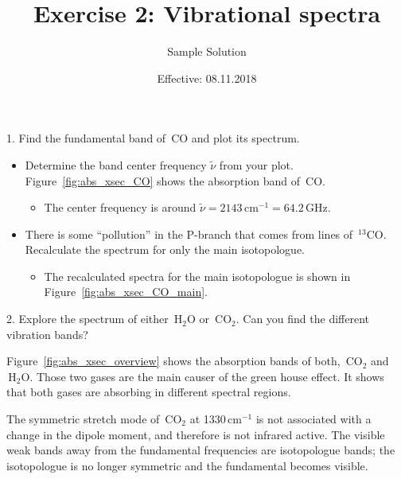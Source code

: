 \documentclass[paper=a4, fontsize=11pt]{scrartcl} %
\title{Exercise 2: Vibrational spectra}
\author{Sample Solution}
\date{Effective: 08.11.2018}
\newcommand{\symb}[1]{$\,\mathrm{#1}$}
\begin{document}
\maketitle

1. Find the fundamental band of \symb{CO} and plot its spectrum.
\begin{itemize}
  \item Determine the band center frequency $\tilde{\nu}$ from your plot.
    Figure~\ref{fig:abs_xsec_CO} shows the absorption band of \symb{CO}.
    \begin{itemize}
      \item The center frequency is around
        $\tilde{\nu} = 2143\,\mathrm{cm}^{-1} = 64.2\,\mathrm{GHz}$.
    \end{itemize}

  \item There is some “pollution” in the P-branch that comes from lines
    of \symb{^{13}CO}. Recalculate the spectrum for only the main isotopologue.
    \begin{itemize}
      \item The recalculated spectra for the main isotopologue is shown in
        Figure~\ref{fig:abs_xsec_CO_main}.
    \end{itemize}
\end{itemize}

2. Explore the spectrum of either \symb{H_2O} or \symb{CO_2}. Can you find the
different vibration bands?

Figure~\ref{fig:abs_xsec_overview} shows the absorption bands of both,
\symb{CO_2} and \symb{H_2O}. Those two gases are the main causer of the green
house effect. It shows that both gases are absorbing in different spectral
regions.

The symmetric stretch mode of \symb{CO_2} at 1330\,cm$^{-1}$ is not associated
with a change in the dipole moment, and therefore is not infrared active. The
visible weak bands away from the fundamental frequencies are isotopologue
bands; the isotopologue is no longer symmetric and the fundamental becomes
visible.
\end{document}
